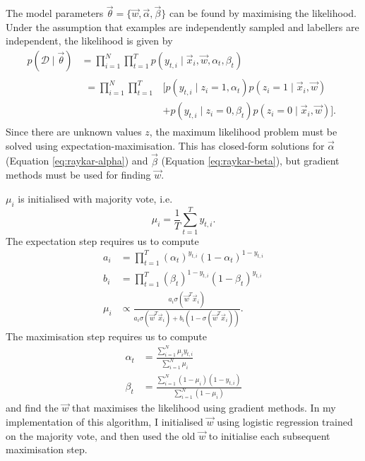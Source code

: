         The model parameters $\vec \theta = \{\vec w, \vec \alpha, \vec \beta\}$
        can be found by maximising the likelihood. Under the assumption that
        examples are independently sampled and labellers are independent, the
        likelihood is given by
        \begin{align*}
            p(\mathcal D \mid \vec \theta) &=
                \prod_{i = 1}^N
                    \prod_{t = 1}^T
                        p(y_{t, i} \mid \vec x_i, \vec w, \alpha_t, \beta_t)\\
            &\begin{aligned}=
                \prod_{i = 1}^N
                    \prod_{t = 1}^T
                        &\bigg[p(y_{t, i} \mid z_i = 1, \alpha_t)
                            p(z_i = 1 \mid \vec x_i, \vec w)\\
                        &+ p(y_{t, i} \mid z_i = 0, \beta_t)
                            p(z_i = 0 \mid \vec x_i, \vec w)\bigg].
             \end{aligned}
        \end{align*}
        Since there are unknown values $z$, the maximum likelihood problem must
        be solved using expectation-maximisation. This has closed-form solutions
        for $\vec \alpha$ (Equation \ref{eq:raykar-alpha}) and $\vec \beta$
        (Equation \ref{eq:raykar-beta}), but gradient methods must be used for
        finding $\vec w$.

        $\mu_i$ is initialised with majority vote, i.e.
        \begin{equation*}
            \mu_i = \frac{1}{T} \sum_{t = 1}^T y_{t, i}.
        \end{equation*}
        The expectation step requires us to compute
        \begin{align*}
            a_i &= \prod_{t = 1}^T
                (\alpha_t)^{y_{t, i}} (1 - \alpha_t)^{1 - y_{t, i}}\\
            b_i &= \prod_{t = 1}^T
                (\beta_t)^{1 - y_{t, i}} (1 - \beta_t)^{y_{t, i}}\\
            \mu_i &\propto
                \frac{a_i \sigma(\vec w^T \vec x_i)}
                     {a_i \sigma(\vec w^T \vec x_i) +
                      b_i (1 - \sigma(\vec w^T \vec x_i))}.
        \end{align*}
        The maximisation step requires us to compute
        \begin{align}
            \label{eq:raykar-alpha}
            \alpha_t &= \frac{\sum_{i = 1}^N \mu_i y_{t, i}}
                             {\sum_{i = 1}^N \mu_i}\\
            \label{eq:raykar-beta}
            \beta_t &= \frac{\sum_{i = 1}^N (1 - \mu_i) (1 - y_{t, i})}
                            {\sum_{i = 1}^N (1 - \mu_i)}
        \end{align}
        and find the $\vec w$ that maximises the likelihood using gradient
        methods. In my implementation of this algorithm, I initialised $\vec w$
        using logistic regression trained on the majority vote, and then used
        the old $\vec w$ to initialise each subsequent maximisation step.

